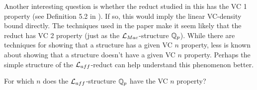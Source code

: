 Another interesting question is whether the reduct studied in this \chapa has the VC 1 property (see Definition 5.2 in \cite{density}).
If so, this would imply the linear VC-density bound directly.
The techniques used in the paper \cite{density} make it seem likely that the reduct has VC 2 property (just as the $\mathcal L_{Mac}$-structure $\mathbb{Q}_p$).
While there are techniques for showing that a structure has a given VC $n$ property,
less is known about showing that a structure doesn't have a given VC $n$ property.
Perhaps the simple structure of the $\mathcal L_{aff}$-reduct can help understand this phenomenon better.
\begin{openq}
  For which $n$ does the $\mathcal L_{aff}$-structure $\mathbb{Q}_p$ have the VC $n$ property?
\end{openq}
